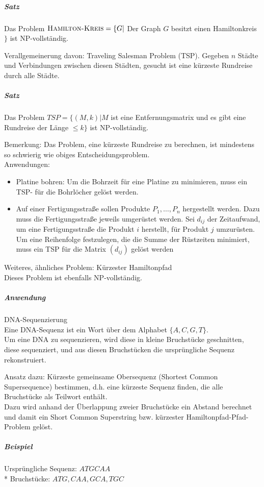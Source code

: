\documentclass[a4paper]{scrartcl}
\begin{document}
\subparagraph{Satz} Das Problem $\textsc{Hamilton-Kreis} = \{ G |$ Der Graph $G$ besitzt einen Hamiltonkreis $\}$ ist NP-vollständig.

Verallgemeinerung davon: Traveling Salesman Problem (TSP). Gegeben $n$ Städte und Verbindungen zwischen diesen Städten, gesucht ist eine kürzeste Rundreise durch alle Städte.

\subparagraph{Satz} Das Problem $TSP = \{(M,k)|M$ ist eine Entfernungsmatrix und es gibt eine Rundreise der Länge $\leq k \}$ ist \textsc{NP}-vollständig.

Bemerkung: Das Problem, eine kürzeste Rundreise zu berechnen, ist mindestens so schwierig wie obiges Entscheidungsproblem.\\
Anwendungen:
\begin{itemize}
\item Platine bohren: Um die Bohrzeit für eine Platine zu minimieren, muss ein TSP- für die Bohrlöcher gelöst werden.
\item Auf einer Fertigungsstraße sollen Produkte $P_1,\dots,P_n$ hergestellt werden. Dazu muss die Fertigungsstraße jeweils umgerüstet werden. Sei $d_{ij}$ der Zeitaufwand, um eine Fertigungsstraße die Produkt $i$ herstellt, für Produkt $j$ umzurüsten.\\
Um eine Reihenfolge festzulegen, die die Summe der Rüstzeiten minimiert, muss ein TSP für die Matrix $(d_{ij})$ gelöst werden
\end{itemize}

Weiteres, ähnliches Problem: Kürzester Hamiltonpfad\\
Dieses Problem ist ebenfalls \textsc{NP}-vollständig.

\subparagraph{Anwendung} DNA-Sequenzierung\\
Eine DNA-Sequenz ist ein Wort über dem Alphabet $\{A,C,G,T\}$.\\
Um eine DNA zu sequenzieren, wird diese in kleine Bruchstücke geschnitten, diese sequenziert, und aus diesen Bruchstücken die ursprüngliche Sequenz rekonstruiert.

Ansatz dazu: Kürzeste gemeinsame Obersequenz (Shortest Common Supersequence) bestimmen, d.h. eine kürzeste Sequenz finden, die alle Bruchstücke als Teilwort enthält.\\
Dazu wird anhand der Überlappung zweier Bruchstücke ein Abstand berechnet und damit ein Short Common Superstring bzw. kürzester Hamiltonpfad-Pfad-Problem gelöst.

\subparagraph{Beispiel} Ursprüngliche Sequenz: $ATGCAA$\\*
Bruchstücke: $ATG,CAA,GCA,TGC$
\end{document}
